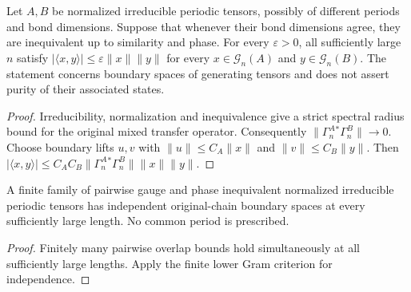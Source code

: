 \begin{lemma}
    \label{thm:periodic_boundary_overlap_decay}
    \leanok
    Let $A,B$ be normalized irreducible periodic tensors, possibly of
    different periods and bond dimensions. Suppose that whenever their
    bond dimensions agree, they are inequivalent up to similarity and phase.
    For every $\varepsilon>0$, all sufficiently large $n$ satisfy
    $|\langle x,y\rangle|\leq\varepsilon\|x\|\|y\|$ for every
    $x\in\mathcal G_n(A)$ and $y\in\mathcal G_n(B)$.
    The statement concerns boundary spaces of generating tensors and does
    not assert purity of their associated states.
\end{lemma}
\begin{proof}\leanok
    Irreducibility, normalization and inequivalence give a strict spectral
    radius bound for the original mixed transfer operator. Consequently
    $\|\Gamma^A_n{}^*\Gamma^B_n\|\to0$.
    Choose boundary lifts $u,v$ with
    $\|u\|\leq C_A\|x\|$ and $\|v\|\leq C_B\|y\|$. Then
    $|\langle x,y\rangle|
        \leq C_AC_B\|\Gamma^A_n{}^*\Gamma^B_n\|\|x\|\|y\|$.
\end{proof}

\begin{lemma}
    \label{thm:periodic_ground_space_eventual_independence}
    \leanok
    A finite family of pairwise gauge and phase inequivalent normalized
    irreducible periodic tensors has independent original-chain boundary
    spaces at every sufficiently large length. No common period is prescribed.
\end{lemma}
\begin{proof}\leanok
    Finitely many pairwise overlap bounds hold simultaneously at all
    sufficiently large lengths. Apply the finite lower Gram criterion
    for independence.
\end{proof}

